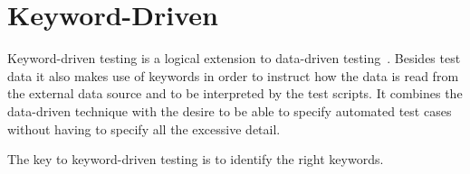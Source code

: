 \section{Keyword-Driven}

Keyword-driven testing is a logical extension to data-driven testing~\cite{Fewster99}.
Besides test data it also makes use of keywords in order to instruct how the
data is read from the external data source and to be interpreted by the test
scripts. It combines the data-driven technique with the desire to be able to
specify automated test cases without having to specify all the excessive detail.

The key to keyword-driven testing is to identify the right keywords.